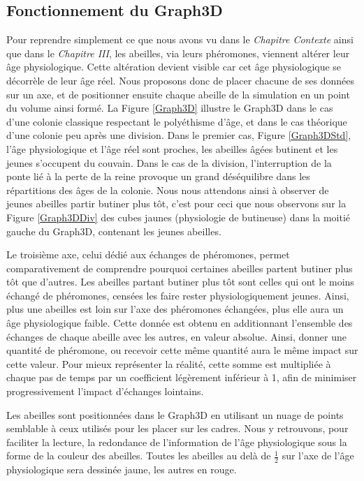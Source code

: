 		\subsection{Fonctionnement du Graph3D}
		
		Pour reprendre simplement ce que nous avons vu dans le \textit{Chapitre Contexte} ainsi que dans le \textit{Chapitre III}, les abeilles, via leurs phéromones, viennent altérer leur âge physiologique. Cette altération devient visible car cet âge physiologique se décorrèle de leur âge réel. Nous proposons donc de placer chacune de ses données sur un axe, et de positionner ensuite chaque abeille de la simulation en un point du volume ainsi formé. La Figure \ref{Graph3D} illustre le Graph3D dans le cas d'une colonie classique respectant le polyéthisme d'âge, et dans le cas théorique d'une colonie peu après une division. Dans le premier cas, Figure \ref{Graph3DStd}, l'âge physiologique et l'âge réel sont proches, les abeilles âgées butinent et les jeunes s'occupent du couvain. Dans le cas de la division, l'interruption de la ponte lié à la perte de la reine provoque un grand déséquilibre dans les répartitions des âges de la colonie. Nous nous attendons ainsi à observer de jeunes abeilles partir butiner plus tôt, c'est pour ceci que nous observons sur la Figure \ref{Graph3DDiv} des cubes jaunes (physiologie de butineuse) dans la moitié gauche du Graph3D, contenant les jeunes abeilles.
		
		Le troisième axe, celui dédié aux échanges de phéromones, permet comparativement de comprendre pourquoi certaines abeilles partent butiner plus tôt que d'autres. Les abeilles partant butiner plus tôt sont celles qui ont le moins échangé de phéromones, censées les faire rester physiologiquement jeunes. Ainsi, plus une abeilles est loin sur l'axe des phéromones échangées, plus elle aura un âge physiologique faible. Cette donnée est obtenu en additionnant l'ensemble des échanges de chaque abeille avec les autres, en valeur absolue. Ainsi, donner une quantité de phéromone, ou recevoir cette même quantité aura le même impact sur cette valeur. Pour mieux représenter la réalité, cette somme est multipliée à chaque pas de temps par un coefficient légèrement inférieur à 1, afin de minimiser progressivement l'impact d'échanges lointains.
		
		Les abeilles sont positionnées dans le Graph3D en utilisant un nuage de points semblable à ceux utilisés pour les placer sur les cadres. Nous y retrouvons, pour faciliter la lecture, la redondance de l'information de l'âge physiologique sous la forme de la couleur des abeilles. Toutes les abeilles au delà de $\frac{1}{2}$ sur l'axe de l'âge physiologique sera dessinée jaune, les autres en rouge.
		
